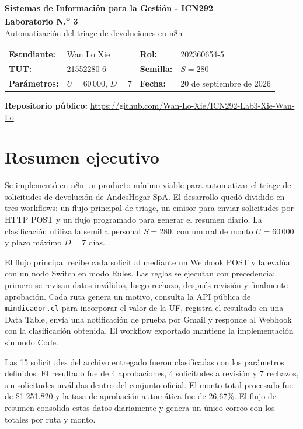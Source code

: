 \documentclass[11pt,a4paper]{article}
\newcommand{\repo}{\url{https://github.com/Wan-Lo-Xie/ICN292-Lab3-Xie-Wan-Lo}}
\begin{document}
\begin{center}
    {\Large\bfseries Sistemas de Información para la Gestión - ICN292}\\[4pt]
    {\LARGE\bfseries Laboratorio N.\textsuperscript{o} 3}\\[2pt]
    {\large Automatización del triage de devoluciones en n8n}\\[10pt]
\end{center}

\begin{tabularx}{\textwidth}{@{}>{\bfseries}l X >{\bfseries}l X@{}}
Estudiante: & Wan Lo Xie & Rol: & 202360654-5 \\
TUT: & 21552280-6 & Semilla: & $S=280$ \\
Parámetros: & $U=60\,000$, $D=7$ & Fecha: & 20 de septiembre de 2026 \\
\end{tabularx}

\vspace{4pt}
\textbf{Repositorio público:} \repo

\section*{Resumen ejecutivo}

Se implementó en n8n un producto mínimo viable para automatizar el triage de solicitudes de devolución de AndesHogar SpA. El desarrollo quedó dividido en tres workflows: un flujo principal de triage, un emisor para enviar solicitudes por HTTP POST y un flujo programado para generar el resumen diario. La clasificación utiliza la semilla personal $S=280$, con umbral de monto $U=60\,000$ y plazo máximo $D=7$ días.

El flujo principal recibe cada solicitud mediante un Webhook POST y la evalúa con un nodo Switch en modo Rules. Las reglas se ejecutan con precedencia: primero se revisan datos inválidos, luego rechazo, después revisión y finalmente aprobación. Cada ruta genera un motivo, consulta la API pública de \texttt{mindicador.cl} para incorporar el valor de la UF, registra el resultado en una Data Table, envía una notificación de prueba por Gmail y responde al Webhook con la clasificación obtenida. El workflow exportado mantiene la implementación sin nodo Code.

Las 15 solicitudes del archivo entregado fueron clasificadas con los parámetros definidos. El resultado fue de 4 aprobaciones, 4 solicitudes a revisión y 7 rechazos, sin solicitudes inválidas dentro del conjunto oficial. El monto total procesado fue de \$1.251.820 y la tasa de aprobación automática fue de 26,67\%. El flujo de resumen consolida estos datos diariamente y genera un único correo con los totales por ruta y monto.
\end{document}
